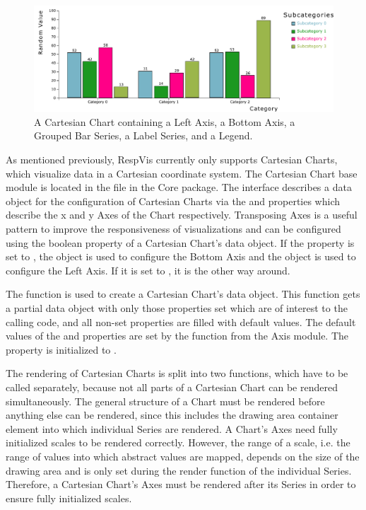 \begin{figure}[tp]
\centering
\includegraphics[keepaspectratio,width=\linewidth,height=\fullh]
{diagrams/chart.pdf}
\caption[Cartesian Chart Example]{%
A Cartesian Chart containing a Left Axis, a Bottom Axis,
a Grouped Bar Series, a Label Series, and a Legend.
}
\label{fig:Chart}
\end{figure}


As mentioned previously, RespVis currently only supports Cartesian
Charts, which visualize data in a Cartesian coordinate system. The
Cartesian Chart base module is located in the
 file in the Core package. The
 interface describes a data object for the
configuration of Cartesian Charts via the  and
  properties which describe the x and y Axes of
the Chart respectively. Transposing Axes is a useful pattern to
improve the responsiveness of visualizations and can be configured
using the  boolean property of a Cartesian Chart's data
object. If the  property is set to , the
 object is used to configure the Bottom Axis and the
 object is used to configure the Left Axis. If it is set
to , it is the other way around.

The  function is used to create a
Cartesian Chart's data object. This function gets a partial data
object with only those properties set which are of interest to the
calling code, and all non-set properties are filled with default
values. The default values of the  and 
properties are set by the  function from the Axis
module. The  property is initialized to .

The rendering of Cartesian Charts is split into two functions, which
have to be called separately, because not all parts of a Cartesian
Chart can be rendered simultaneously. The general structure of a Chart
must be rendered before anything else can be rendered, since this
includes the drawing area container element into which individual Series
are rendered. A Chart's Axes need fully initialized scales to be
rendered correctly. However, the range of a scale, i.e. the range of
values into which abstract values are mapped, depends on the size of
the drawing area and is only set during the render function of the
individual Series. Therefore, a Cartesian Chart's Axes must be
rendered after its Series in order to ensure fully initialized scales.

